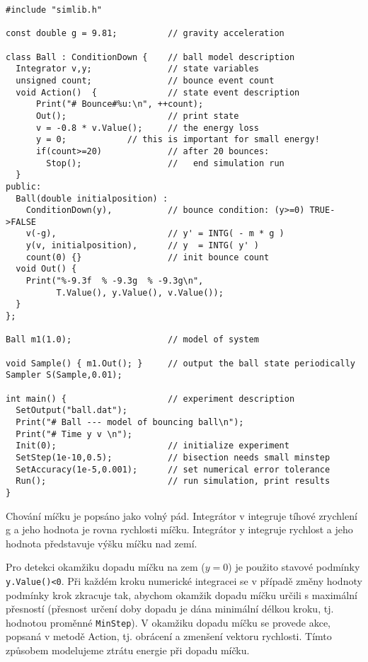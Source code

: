 \documentclass[a4paper]{article}
\begin{document}
{\small
\begin{verbatim}
#include "simlib.h"

const double g = 9.81;          // gravity acceleration

class Ball : ConditionDown {    // ball model description
  Integrator v,y;               // state variables
  unsigned count;               // bounce event count
  void Action()  {              // state event description
      Print("# Bounce#%u:\n", ++count);
      Out();                    // print state
      v = -0.8 * v.Value();     // the energy loss
      y = 0;            // this is important for small energy!
      if(count>=20)             // after 20 bounces:
        Stop();                 //   end simulation run
  }
public:
  Ball(double initialposition) :
    ConditionDown(y),           // bounce condition: (y>=0) TRUE->FALSE
    v(-g),                      // y' = INTG( - m * g )
    y(v, initialposition),      // y  = INTG( y' )
    count(0) {}                 // init bounce count
  void Out() {
    Print("%-9.3f  % -9.3g  % -9.3g\n",
          T.Value(), y.Value(), v.Value());
  }
};

Ball m1(1.0);                   // model of system

void Sample() { m1.Out(); }     // output the ball state periodically
Sampler S(Sample,0.01);

int main() {                    // experiment description
  SetOutput("ball.dat");
  Print("# Ball --- model of bouncing ball\n");
  Print("# Time y v \n");
  Init(0);                      // initialize experiment
  SetStep(1e-10,0.5);           // bisection needs small minstep
  SetAccuracy(1e-5,0.001);      // set numerical error tolerance
  Run();                        // run simulation, print results
}
\end{verbatim}
}

Chování míčku je popsáno jako volný pád. Integrátor v integruje
tíhové zrychlení g a jeho hodnota je rovna rychlosti míčku.
Integrátor y integruje rychlost a jeho hodnota představuje výšku
míčku nad zemí.

Pro detekci okamžiku dopadu míčku na zem ($y=0$) je použito stavové podmínky
\verb|y.Value()<0|. 
Při každém kroku numerické integracei se v případě změny hodnoty
podmínky krok zkracuje tak, abychom okamžik dopadu míčku určili s
maximální přesností (přesnost určení doby dopadu je dána minimální délkou
kroku, tj. hodnotou proměnné \verb|MinStep|). V okamžiku dopadu míčku se provede
akce, popsaná v metodě Action, tj. obrácení a zmenšení vektoru rychlosti.
Tímto způsobem modelujeme ztrátu energie při dopadu míčku.
\end{document}
